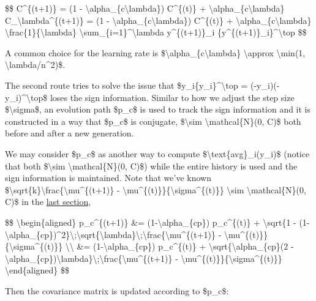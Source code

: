 \$\$ C\^{}\{(t+1)\} = (1 - \textbackslash alpha\_\{c\textbackslash lambda\}) C\^{}\{(t)\} + \textbackslash alpha\_\{c\textbackslash lambda\} C\_\textbackslash lambda\^{}\{(t+1)\} = (1 - \textbackslash alpha\_\{c\textbackslash lambda\}) C\^{}\{(t)\} + \textbackslash alpha\_\{c\textbackslash lambda\} \textbackslash frac\{1\}\{\textbackslash lambda\} \textbackslash sum\_\{i=1\}\^{}\textbackslash lambda y\^{}\{(t+1)\}\_i \{y\^{}\{(t+1)\}\_i\}\^{}\textbackslash top \$\$

A common choice for the learning rate is \$\textbackslash alpha\_\{c\textbackslash lambda\} \textbackslash approx \textbackslash min(1, \textbackslash lambda/n\^{}2)\$.

The second route tries to solve the issue that \$y\_i\{y\_i\}\^{}\textbackslash top = (-y\_i)(-y\_i)\^{}\textbackslash top\$ loses the sign information. Similar to how we adjust the step size \$\textbackslash sigma\$, an evolution path \$p\_c\$ is used to track the sign information and it is constructed in a way that \$p\_c\$ is conjugate, \$\textbackslash sim \textbackslash mathcal\{N\}(0, C)\$ both before and after a new generation.

We may consider \$p\_c\$ as another way to compute \$\textbackslash text\{avg\}\_i(y\_i)\$ (notice that both \$\textbackslash sim \textbackslash mathcal\{N\}(0, C)\$) while the entire history is used and the sign information is maintained. Note that we've known \$\textbackslash sqrt\{k\}\textbackslash frac\{\textbackslash mu\^{}\{(t+1)\} - \textbackslash mu\^{}\{(t)\}\}\{\textbackslash sigma\^{}\{(t)\}\} \textbackslash sim \textbackslash mathcal\{N\}(0, C)\$ in the \hyperref[controlling-the-step-size]{last section},

\$\$ \textbackslash begin\{aligned\} p\_c\^{}\{(t+1)\} \&= (1-\textbackslash alpha\_\{cp\}) p\_c\^{}\{(t)\} + \textbackslash sqrt\{1 - (1-\textbackslash alpha\_\{cp\})\^{}2\}\textbackslash;\textbackslash sqrt\{\textbackslash lambda\}\textbackslash;\textbackslash frac\{\textbackslash mu\^{}\{(t+1)\} - \textbackslash mu\^{}\{(t)\}\}\{\textbackslash sigma\^{}\{(t)\}\} \textbackslash\textbackslash{} \&= (1-\textbackslash alpha\_\{cp\}) p\_c\^{}\{(t)\} + \textbackslash sqrt\{\textbackslash alpha\_\{cp\}(2 - \textbackslash alpha\_\{cp\})\textbackslash lambda\}\textbackslash;\textbackslash frac\{\textbackslash mu\^{}\{(t+1)\} - \textbackslash mu\^{}\{(t)\}\}\{\textbackslash sigma\^{}\{(t)\}\} \textbackslash end\{aligned\} \$\$

Then the covariance matrix is updated according to \$p\_c\$:

